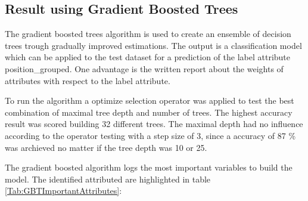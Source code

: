 \subsection{Result using Gradient Boosted Trees}

The gradient boosted trees algorithm is used to create an ensemble of decision trees trough gradually improved estimations. The output is a classification model which can be applied to the test dataset for a prediction of the label attribute position\_grouped. \newline
One advantage is the written report about the weights of attributes with respect to the label attribute.~\cite{ref_rapidminergbt}

To run the algorithm a optimize selection operator was applied to test the best combination of maximal tree depth and number of trees. The highest accuracy result was scored building 32 different trees. The maximal depth had no influence according to the operator testing with a step size of 3, since a accuracy of 87 \% was archieved no matter if the tree depth was 10 or 25. 

The gradient boosted algorithm logs the most important variables to build the model. The identified attributed are highlighted in table \ref{Tab:GBTImportantAttributes}:

